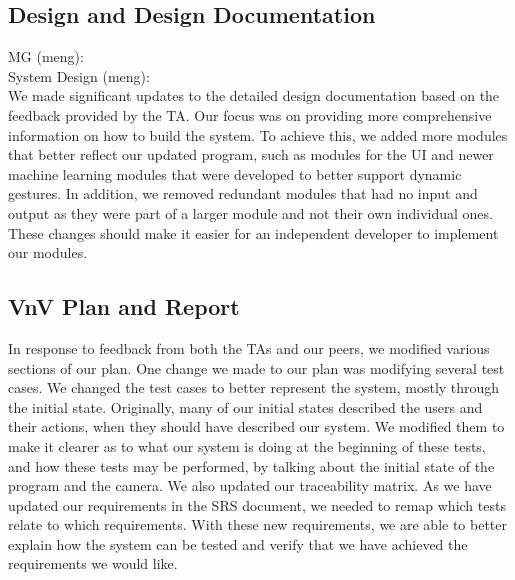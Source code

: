 \documentclass[12pt, titlepage]{article}
\begin{document}
\subsection{Design and Design Documentation}
MG (meng):\\

\noindent System Design (meng):\\

\noindent We made significant updates to the detailed design documentation based on the feedback provided by the TA. Our focus was on providing more comprehensive information on how to build the system. To achieve this, we added more modules that better reflect our updated program, such as modules for the UI and newer machine learning modules that were developed to better support dynamic gestures. In addition, we removed redundant modules that had no input and output as they were part of a larger module and not their own individual ones. These changes should make it easier for an independent developer to implement our modules.\\

\subsection{VnV Plan and Report}
In response to feedback from both the TAs and our peers, we modified various sections of our plan. One change we made to our plan was modifying several test cases. We changed the test cases to better represent the system, mostly through the initial state. Originally, many of our initial states described the users and their actions, when they should have described our system. We modified them to make it clearer as to what our system is doing at the beginning of these tests, and how these tests may be performed, by talking about the initial state of the program and the camera. We also updated our traceability matrix. As we have updated our requirements in the SRS document, we needed to remap which tests relate to which requirements. With these new requirements, we are able to better explain how the system can be tested and verify that we have achieved the requirements we would like.\\
\end{document}
